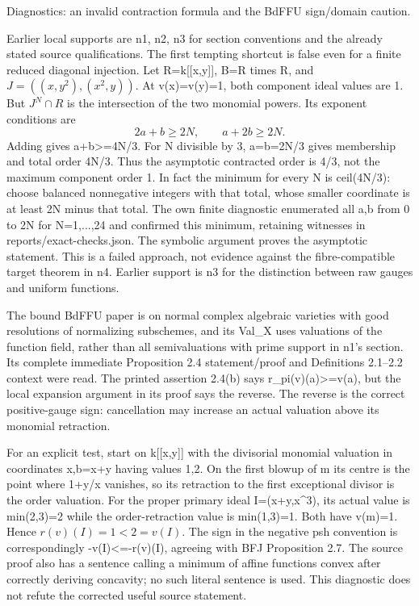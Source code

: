 \documentclass[11pt]{article}
\begin{document}
Diagnostics: an invalid contraction formula and the BdFFU sign/domain caution.

Earlier local supports are n1, n2, n3 for section conventions and the already stated source qualifications. The first tempting shortcut is false even for a finite reduced diagonal injection. Let R=k[[x,y]], B=R times R, and \(J=((x,y^2),(x^2,y))\). At v(x)=v(y)=1, both component ideal values are 1. But \(J^N\cap R\) is the intersection of the two monomial powers. Its exponent conditions are
\[
 2a+b\ge2N,\qquad a+2b\ge2N.
\]
Adding gives a+b>=4N/3. For N divisible by 3, a=b=2N/3 gives membership and total order 4N/3. Thus the asymptotic contracted order is 4/3, not the maximum component order 1. In fact the minimum for every N is ceil(4N/3): choose balanced nonnegative integers with that total, whose smaller coordinate is at least 2N minus that total. The own finite diagnostic enumerated all a,b from 0 to 2N for N=1,...,24 and confirmed this minimum, retaining witnesses in reports/exact-checks.json. The symbolic argument proves the asymptotic statement. This is a failed approach, not evidence against the fibre-compatible target theorem in n4. Earlier support is n3 for the distinction between raw gauges and uniform functions.

The bound BdFFU paper is on normal complex algebraic varieties with good resolutions of normalizing subschemes, and its Val\_X uses valuations of the function field, rather than all semivaluations with prime support in n1's section. Its complete immediate Proposition 2.4 statement/proof and Definitions 2.1--2.2 context were read. The printed assertion 2.4(b) says r\_pi(v)(a)>=v(a), but the local expansion argument in its proof says the reverse. The reverse is the correct positive-gauge sign: cancellation may increase an actual valuation above its monomial retraction.

For an explicit test, start on k[[x,y]] with the divisorial monomial valuation in coordinates x,b=x+y having values 1,2. On the first blowup of m its centre is the point where 1+y/x vanishes, so its retraction to the first exceptional divisor is the order valuation. For the proper primary ideal I=(x+y,x\textasciicircum{}3), its actual value is min(2,3)=2 while the order-retraction value is min(1,3)=1. Both have v(m)=1. Hence \(r(v)(I)=1<2=v(I)\). The sign in the negative psh convention is correspondingly -v(I)<=-r(v)(I), agreeing with BFJ Proposition 2.7. The source proof also has a sentence calling a minimum of affine functions convex after correctly deriving concavity; no such literal sentence is used. This diagnostic does not refute the corrected useful source statement.
\end{document}
